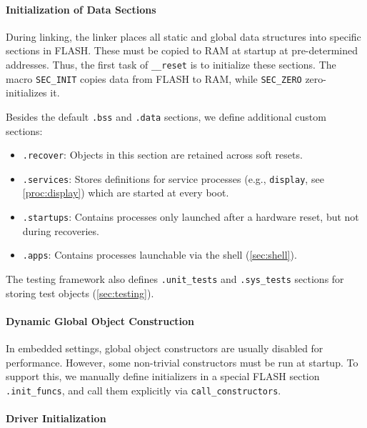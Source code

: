 \paragraph*{Initialization of Data Sections} 

During linking, the linker places all static and global data structures into specific
sections in FLASH. These must be copied to RAM at startup at pre-determined addresses.
Thus, the first task of \lstinline[style=myagc]|__reset| is to initialize these
sections. The macro \lstinline[style=myagc]|SEC_INIT| copies data from FLASH to RAM,
while \lstinline[style=myagc]|SEC_ZERO| zero-initializes it.

Besides the default \lstinline[style=myagc]|.bss| and \lstinline[style=myagc]|.data|
sections, we define additional custom sections:
\begin{itemize}
    \item \lstinline[style=myagc]|.recover|: Objects in this section are retained
        across soft resets.
    \item \lstinline[style=myagc]|.services|: Stores definitions for service processes
        (e.g., \lstinline[style=myagc]|display|, see \autoref{proc:display}) which are
        started at every boot.
    \item \lstinline[style=myagc]|.startups|: Contains processes only launched after a
        hardware reset, but not during recoveries.
    \item \lstinline[style=myagc]|.apps|: Contains processes launchable via the shell
        (\autoref{sec:shell}).
\end{itemize}

The testing framework also defines \lstinline[style=myagc]|.unit_tests| and
\lstinline[style=myagc]|.sys_tests| sections for storing test objects
(\autoref{sec:testing}).

\paragraph*{Dynamic Global Object Construction} 

In embedded settings, global object constructors are usually disabled for performance.
However, some non-trivial constructors must be run at startup. To support this, we
manually define initializers in a special FLASH section
\lstinline[style=myagc]|.init_funcs|, and call them explicitly via
\lstinline[style=myagc,
basicstyle=\bfseries\codestyle\codefontsize]|call_constructors|.

\paragraph*{Driver Initialization} 

